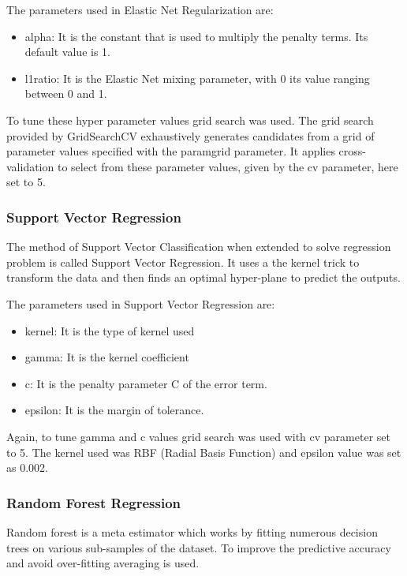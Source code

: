 \documentclass[conference]{IEEEtran}
\begin{document}
The parameters used in Elastic Net Regularization are:
\begin{itemize}
    \item alpha: It is the constant that is used to multiply the penalty terms. Its default value is 1.
    \item l1\textunderscore ratio: It is the Elastic Net mixing parameter, with 0 its value ranging between 0 and 1.
\end{itemize}
To tune these hyper parameter values grid search was used. The grid search provided by GridSearchCV exhaustively generates candidates from a grid of parameter values specified with the param\textunderscore grid parameter. It applies cross-validation to select from these parameter values, given by the cv parameter, here set to 5. \\

\subsubsection{Support Vector Regression}

The method of Support Vector Classification when extended to solve regression problem is called Support Vector Regression. It uses a the kernel trick to transform the data and then finds an optimal hyper-plane to predict the outputs. 

The parameters used in Support Vector Regression are:
\begin{itemize}
    \item kernel: It is the type of kernel used
    \item gamma: It is the kernel coefficient
    \item c: It is the penalty parameter C of the error term.
    \item epsilon: It is the margin of tolerance.
\end{itemize}

Again, to tune gamma and c values grid search was used with cv parameter set to 5. The kernel used was RBF (Radial Basis Function) and epsilon value was set as 0.002. \\

\subsubsection{Random Forest Regression}

Random forest is a meta estimator which works by fitting numerous decision trees on various sub-samples of the dataset. To improve the predictive accuracy and avoid over-fitting averaging is used.
\end{document}
